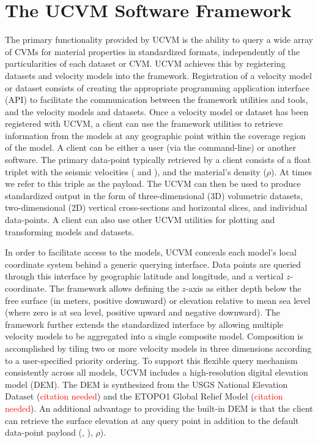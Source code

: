 



\section{The UCVM Software Framework}\label{sec:ucvm}

The primary functionality provided by UCVM is the ability to query a wide array of CVMs for material properties in standardized formats, independently of the particularities of each dataset or CVM. UCVM achieves this by registering datasets and velocity models into the framework. Registration of a velocity model or dataset consists of creating the appropriate programming application interface (API) to facilitate the communication between the framework utilities and tools, and the velocity models and datasets. Once a velocity model or dataset has been registered with UCVM, a client can use the framework utilities to retrieve information from the models at any geographic point within the coverage region of the model. A client can be either a user (via the command-line) or another software. The primary data-point typically retrieved by a client consists of a float triplet with the seismic velocities (\vp{} and \vs{}), and the material's density ($\rho$). At times we refer to this triple as the payload. The UCVM can then be used to produce standardized output in the form of three-dimensional (3D) volumetric datasets, two-dimensional (2D) vertical cross-sections and horizontal slices, and individual data-points. A client can also use other UCVM utilities for plotting and transforming models and datasets.

In order to facilitate access to the models, UCVM conceals each model's local coordinate system behind a generic querying interface. Data points are queried through this interface by geographic latitude and longitude, and a vertical $z$-coordinate. The framework allows defining the $z$-axis as either depth below the free surface (in meters, positive downward) or elevation relative to mean sea level (where zero is at sea level, positive upward and negative downward). The framework further extends the standardized interface by allowing multiple velocity models to be aggregated into a single composite model. Composition is accomplished by tiling two or more velocity models in three dimensions according to a user-specified priority ordering. To support this flexible query mechanism consistently across all models, UCVM includes a high-resolution digital elevation model (DEM). The DEM is synthesized from the USGS National Elevation Dataset (\textcolor{red}{citation needed}) and the ETOPO1 Global Relief Model (\textcolor{red}{citation needed}). An additional advantage to providing the built-in DEM is that the client can retrieve the surface elevation at any query point in addition to the default data-point payload (\vp{}, \vs{}), $\rho$).

